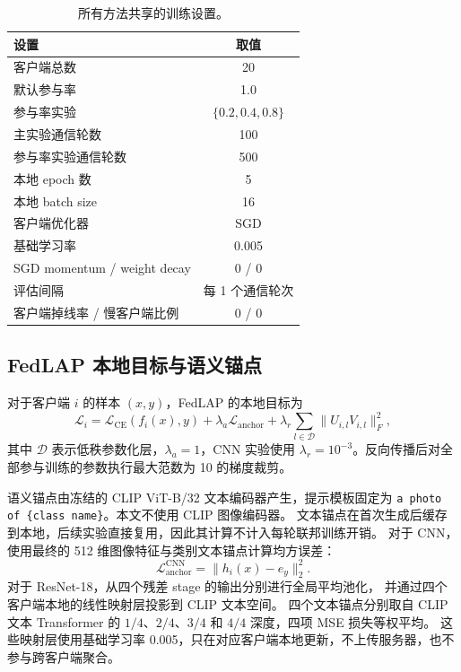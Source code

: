 \begin{table}[t]
\centering
\caption{所有方法共享的训练设置。}
\label{tab:appendix_training_protocol}
\small
\setlength{\tabcolsep}{6pt}
\renewcommand{\arraystretch}{1.10}
\begin{tabular}{lc}
\toprule
\textbf{设置} & \textbf{取值} \\
\midrule
客户端总数 & 20 \\
默认参与率 & 1.0 \\
参与率实验 & $\{0.2,0.4,0.8\}$ \\
主实验通信轮数 & 100 \\
参与率实验通信轮数 & 500 \\
本地 epoch 数 & 5 \\
本地 batch size & 16 \\
客户端优化器 & SGD \\
基础学习率 & 0.005 \\
SGD momentum / weight decay & 0 / 0 \\
评估间隔 & 每 1 个通信轮次 \\
客户端掉线率 / 慢客户端比例 & 0 / 0 \\
\bottomrule
\end{tabular}
\end{table}

\subsection{FedLAP 本地目标与语义锚点}

对于客户端 $i$ 的样本 $(x,y)$，FedLAP 的本地目标为
\begin{equation}
\mathcal{L}_i=
\mathcal{L}_{\mathrm{CE}}(f_i(x),y)
+\lambda_a\mathcal{L}_{\mathrm{anchor}}
+\lambda_r\sum_{l\in\mathcal{D}}\lVert U_{i,l}V_{i,l}\rVert_F^2,
\end{equation}
其中 $\mathcal{D}$ 表示低秩参数化层，$\lambda_a=1$，CNN 实验使用
$\lambda_r=10^{-3}$。反向传播后对全部参与训练的参数执行最大范数为 10 的梯度裁剪。

语义锚点由冻结的 CLIP ViT-B/32 文本编码器产生，提示模板固定为
\texttt{a photo of \{class name\}}。本文不使用 CLIP 图像编码器。
文本锚点在首次生成后缓存到本地，后续实验直接复用，因此其计算不计入每轮联邦训练开销。
对于 CNN，使用最终的 512 维图像特征与类别文本锚点计算均方误差：
\begin{equation}
\mathcal{L}_{\mathrm{anchor}}^{\mathrm{CNN}}
=\lVert h_i(x)-e_y\rVert_2^2.
\end{equation}
对于 ResNet-18，从四个残差 stage 的输出分别进行全局平均池化，
并通过四个客户端本地的线性映射层投影到 CLIP 文本空间。
四个文本锚点分别取自 CLIP 文本 Transformer 的
$1/4$、$2/4$、$3/4$ 和 $4/4$ 深度，四项 MSE 损失等权平均。
这些映射层使用基础学习率 0.005，只在对应客户端本地更新，不上传服务器，也不参与跨客户端聚合。

